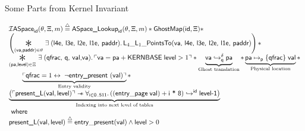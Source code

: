 \documentclass[aspectratio=169,xcolor=dvipsnames]{beamer}
\newcommand{\gammaPred}{\delta}
\newcommand{\ptableabswalk}[1]{\mathcal{A}\textsf{bsPTableWalk}(#1)}
\newcommand{\ptablestore}{\theta}
\newcommand*{\ownGhostpv}[2]{\boxedassertpv[dash dot]{#2}[#1]}
\newcommand{\ghostmaptoken}[3]{\ensuremath{#2\hookrightarrow^{#1}#3}}
\newcommand{\fracghostmaptoken}[4]{\ensuremath{#2\hookrightarrow^{#1}_{#4}#3}}
\newcommand{\vale}{\textsf{val}}
\newcommand{\pvmapping}[1]{\mathcal{A}\textsf{PVMappings}(#1)}
\begin{document}
\begin{frame}{Some Parts from Kernel Invariant}\scriptsize
    \begin{definition}
        
\[
\begin{array}{l}
  \mathcal{I}\textsf{ASpace}_{\textsf{id}}(\ptablestore,\Xi,m)\stackrel{\triangle}{=} \textsf{ASpace\_Lookup}_{\textsf{id}}(\ptablestore,\Xi,m) \ast \mathsf{GhostMap}(\mathsf{id},\Xi)\ast\\
  \left(\bigast{(\vaddr, \textsf{paddr})\in \ptablestore}{\exists\;(\textsf{l4e, l3e, l2e, l1e, paddr})\ldotp \textsf{L}_{4}\_\textsf{L}_{1}\_\textsf{PointsTo}(\vaddr\textsf{, l4e, l3e, l2e, l1e, paddr})}\right)\ast \\
  \bigast{(\paddr,\mathsf{level}) \in \Xi}{\exists\; (\textsf{qfrac, q, val,}\vaddr) \ldotp \ulcorner \vaddr = \paddr + \textsf{KERNBASE} \; \textsf{level} > 1\urcorner \ast  \underbrace{\fracghostmaptoken{\delta}{\vaddr}{\paddr}{\qfrac} }_\text{Ghost translation} \ast \underbrace{\paddr \mapsto_{\mathsf{p}}\{\textsf{qfrac}\}\; \vale}_\text{Physical location}} \ast\\
   \qquad\underbrace{ \ulcorner \textsf{qfrac} = 1 \leftrightarrow \; \lnot\textsf{entry\_present }(\vale) \urcorner}_\text{Entry validity}\ast \\
    \underbrace{\left(\ulcorner\textsf{present\_L}(\vale,\mathsf{level})\urcorner \wand \forall_{\textsf{i}\in\textsf{0..511}} \ldotp \ghostmaptoken{\textsf{id}}{((\mathsf{entry\_page}\;\vale) + \textsf{i * 8})}{\textsf{level-1}}\right)}_{\text{Indexing into next level of tables}} \\ %
  \textsf{ where } \\
  \textsf{present\_L}(\vale,\mathsf{level})\stackrel{\triangle}{=} \mathsf{entry\_present}(\vale)\land \mathsf{level} > 0
  
\end{array}
\]
\end{definition}
\end{frame}
\end{document}
